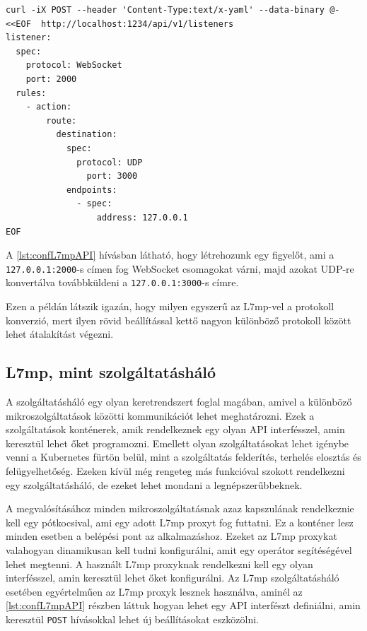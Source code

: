 \begin{lstlisting}[caption=L7mp konfigurálása API-n keresztül, label=lst:confL7mpAPI]
curl -iX POST --header 'Content-Type:text/x-yaml' --data-binary @- <<EOF  http://localhost:1234/api/v1/listeners
listener:
  spec:
    protocol: WebSocket
    port: 2000
  rules:
    - action:
        route:
          destination:
            spec:
              protocol: UDP
                port: 3000
            endpoints:
              - spec:
                  address: 127.0.0.1
EOF
\end{lstlisting}

A \ref{lst:confL7mpAPI} hívásban látható, hogy létrehozunk egy figyelőt, ami a 
\texttt{127.0.0.1:2000}-s címen fog WebSocket csomagokat várni, majd azokat UDP-re 
konvertálva továbbküldeni a \texttt{127.0.0.1:3000}-s címre.

Ezen a példán látszik igazán, hogy milyen egyszerű az L7mp-vel a protokoll konverzió,
mert ilyen rövid beállítással kettő nagyon különböző protokoll között lehet 
átalakítást végezni.

\subsection{L7mp, mint szolgáltatásháló}

A szolgáltatásháló egy olyan keretrendszert foglal magában, amivel a különböző 
mikroszolgáltatások közötti kommunikációt lehet meghatározni. Ezek a szolgáltatások 
konténerek, amik rendelkeznek egy olyan API interfésszel, amin keresztül lehet 
őket programozni. Emellett olyan szolgáltatásokat lehet igénybe venni a Kubernetes 
fürtön belül, mint a szolgáltatás felderítés, terhelés elosztás és felügyelhetőség. 
Ezeken kívül még rengeteg más funkcióval szokott rendelkezni egy szolgáltatásháló, de 
ezeket lehet mondani a legnépszerűbbeknek.

A megvalósításához minden mikroszolgáltatásnak azaz kapszulának rendelkeznie kell 
egy pótkocsival, ami egy adott L7mp proxyt fog futtatni. Ez a konténer lesz minden esetben
a belépési pont az alkalmazáshoz. Ezeket az L7mp proxykat valahogyan dinamikusan kell 
tudni konfigurálni, amit egy operátor segítéségével lehet megtenni. A használt L7mp 
proxyknak rendelkezni kell egy olyan interfésszel, amin keresztül lehet őket 
konfigurálni. Az L7mp szolgáltatásháló esetében egyértelműen az L7mp proxyk lesznek használva, aminél az \ref{lst:confL7mpAPI} részben láttuk hogyan lehet egy API 
interfészt definiálni, amin keresztül \texttt{POST} hívásokkal lehet új beállításokat 
eszközölni.

